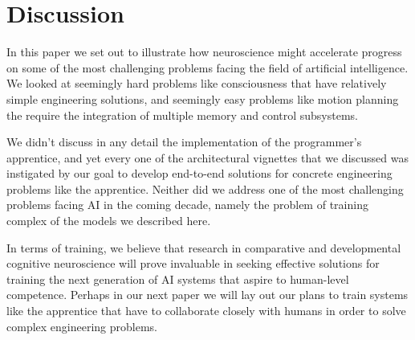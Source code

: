 \section{Discussion}

In this paper we set out to illustrate how neuroscience might accelerate progress on some of the most challenging problems facing the field of artificial intelligence. We looked at seemingly hard problems like consciousness that have relatively simple engineering solutions, and seemingly easy problems like motion planning the require the integration of multiple memory and control subsystems.

We didn't discuss in any detail the implementation of the programmer's apprentice, and yet every one of the architectural vignettes that we discussed was instigated by our goal to develop end-to-end solutions for concrete engineering problems like the apprentice. Neither did we address one of the most challenging problems facing AI in the coming decade, namely the problem of training complex of the models we described here.

In terms of training, we believe that research in comparative and developmental cognitive neuroscience will prove invaluable in seeking effective solutions for training the next generation of AI systems that aspire to human-level competence. Perhaps in our next paper we will lay out our plans to train systems like the apprentice that have to collaborate closely with humans in order to solve complex engineering problems. 

